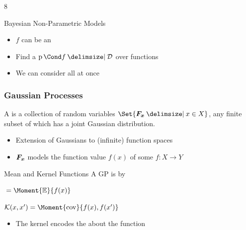 \begin{frame}[label=gp_non_parametric_models]
\begin{overlayarea}{\textwidth}{8\baselineskip}
{\begin{block}{Bayesian Non-Parametric Models}
                \begin{itemize}
                    \item $f$ can be an 
                    \item Find a  $\Prob{f \given \D}$ over functions
                    \item We can consider all  at once
                \end{itemize}
            \end{block}
        }
    \end{overlayarea}
    \vfill
    \centering
\end{frame}

\begin{frame}[label=gp_definition]
    \frametitle{Gaussian Processes}

    \begin{definition}
        A  is a collection of random variables $\Set{\rv{F_x} \with x \in X}$, any finite subset of which has a joint Gaussian distribution.
    \end{definition}
    \begin{itemize}
        \item Extension of Gaussians to (infinite) function spaces
        \item $\bm{F_x}$ models the function value $f(x)$ of some $f : X \to Y$
    \end{itemize}
    \vfill
    \pause
    \begin{block}{Mean and Kernel Functions}
        A GP is  by
        \begin{description}
            \item[Mean function] ${} = \Moment{\E}{f(x)}$
            \item[Kernel function] $\K(x, x^\prime) = \Moment{\cov}{f(x), f(x^\prime)}$
        \end{description}
    \end{block}
    \begin{itemize}
        \item The kernel encodes the  about the function
    \end{itemize}
\end{frame}

